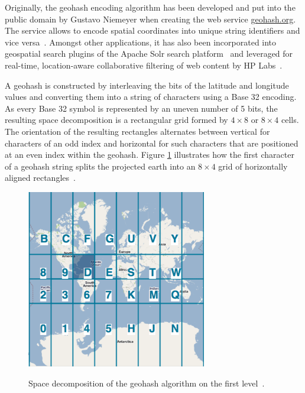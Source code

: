Originally, the geohash encoding algorithm has been developed and put into the public domain by Gustavo Niemeyer when creating the web service \href{http://geohash.org}{geohash.org}. The service allows to encode spatial coordinates into unique string identifiers and vice versa~\cite{wiki:geohash}. Amongst other applications, it has also been incorporated into geospatial search plugins of the Apache Solr search platform~\cite{Smiley11geohash} and leveraged for real-time, location-aware collaborative filtering of web content by HP Labs~\cite{Sand11geohashapp}.

A geohash is constructed by interleaving the bits of the latitude and longitude values and converting them into a string of characters using a Base 32 encoding. As every Base 32 symbol is represented by an uneven number of 5 bits, the resulting  space decomposition is a rectangular grid formed by $4 \times 8$ or $8 \times 4$ cells. The orientation of the resulting rectangles alternates between vertical for characters of an odd index and horizontal for such characters that are positioned at an even index within the geohash. Figure \ref{fig:geohash} illustrates how the first character of a geohash string splits the projected earth into an $8 \times 4$ grid of horizontally aligned rectangles~\cite{wiki:geohash, Smiley11geohash}.

\begin{figure}[h]
  \begin{center}
    \includegraphics[width=0.7\textwidth]{figures/geohash_example.png}
    \label{fig:geohash}
    \caption{Space decomposition of the geohash algorithm on the first level~\cite{Smiley11geohash}.}
  \end{center}
\end{figure}

